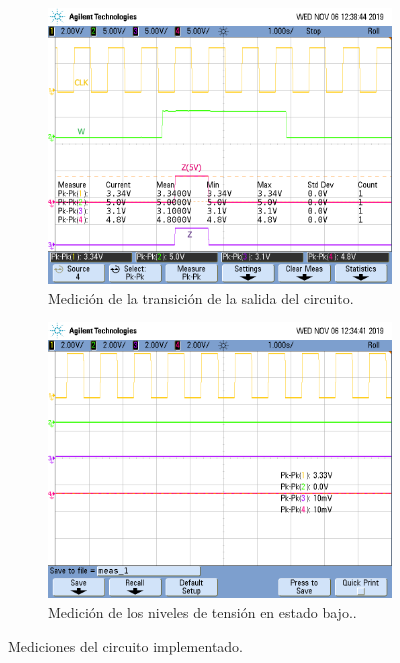 \begin{figure}[H]
\begin{subfigure}{0.49\textwidth}
\centering
\includegraphics[width=\textwidth,trim={0 3.35cm 0.1cm 1.75cm},clip]{ImagenesEjercicio3/output.png}
\caption{Medición de la transición de la salida del circuito.}
\label{output}
\end{subfigure}
\begin{subfigure}{0.49\textwidth}
\centering
\includegraphics[width=\textwidth,trim={0 3.35cm 0.1cm 1.75cm},clip]{ImagenesEjercicio3/vlevels_low.png}
\caption{Medición de los niveles de tensión en estado bajo..}
\end{subfigure}
\caption{Mediciones del circuito implementado.}
\end{figure}

